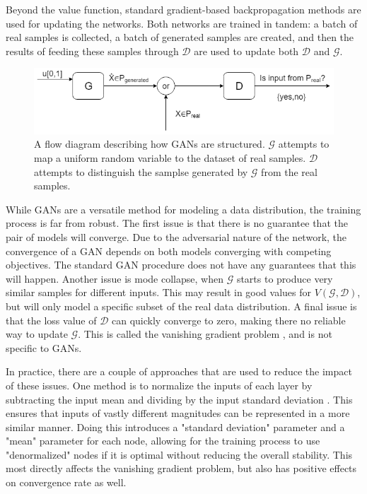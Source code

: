 	\par Beyond the value function, standard gradient-based backpropagation methods are used for updating the networks. Both networks are trained in tandem: a batch of real samples is collected, a batch of generated samples are created, and then the results of feeding these samples through $\mathcal{D}$ are used to update both $\mathcal{D}$ and $\mathcal{G}$.  
	\begin{figure}
		\centering
		\includegraphics[width=\textwidth]{figures/ganOutline.png}
		\caption{A flow diagram describing how GANs are structured. $\mathcal{G}$ attempts to map a uniform random variable to the dataset of real samples. $\mathcal{D}$ attempts to distinguish the samplse generated by $\mathcal{G}$ from the real samples.}
		\label{fig:GanFlowDiagram}
		
	\end{figure}
	\par While GANs are a versatile method for modeling a data distribution, the training process is far from robust. The first issue is that there is no guarantee that the pair of models will converge. Due to the adversarial nature of the network, the convergence of a GAN depends on both models converging with competing objectives. The standard GAN procedure does not have any guarantees that this will happen. Another issue is mode collapse, when $\mathcal{G}$ starts to produce very similar samples for different inputs. This may result in good values for $V(\mathcal{G},\mathcal{D})$, but will only model a specific subset of the real data distribution. A final issue is that the loss value of $\mathcal{D}$ can quickly converge to zero, making there no reliable way to update $\mathcal{G}$. This is called the vanishing gradient problem \cite{bengio1994learning}, and is not specific to GANs. 
	\par In practice, there are a couple of approaches that are used to reduce the impact of these issues. One method is to normalize the inputs of each layer by subtracting the input mean and dividing by the input standard deviation \cite{sola1997importance}. This ensures that inputs of vastly different magnitudes can be represented in a more similar manner. Doing this introduces a "standard deviation" parameter and a "mean" parameter for each node, allowing for the training process to use "denormalized" nodes if it is optimal without reducing the overall stability. This most directly affects the vanishing gradient problem, but also has positive effects on convergence rate as well.
